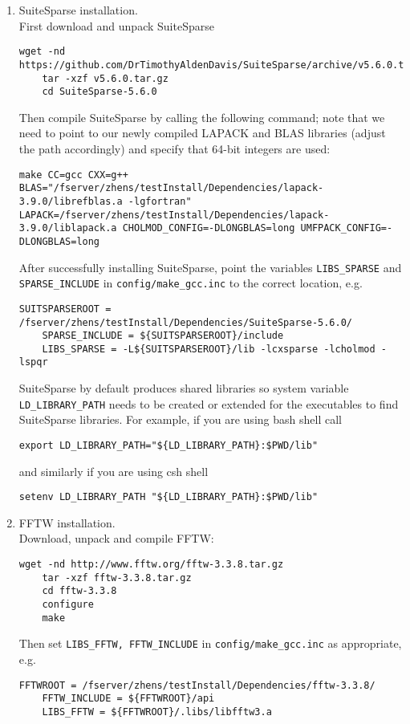 \documentclass[english,11pt]{article}
\begin{document}
\begin{enumerate}
    \item SuiteSparse installation.\\
    First download and unpack SuiteSparse
    \begin{lstlisting}[breaklines=true, showstringspaces=false]
    wget -nd https://github.com/DrTimothyAldenDavis/SuiteSparse/archive/v5.6.0.tar.gz
    tar -xzf v5.6.0.tar.gz
    cd SuiteSparse-5.6.0
    \end{lstlisting}
    Then compile SuiteSparse by calling the following command; note that we need to point to our newly compiled LAPACK and BLAS libraries (adjust the path accordingly) and specify that 64-bit integers are used:
    \begin{lstlisting}[breaklines=true, showstringspaces=false]
    make CC=gcc CXX=g++ BLAS="/fserver/zhens/testInstall/Dependencies/lapack-3.9.0/librefblas.a -lgfortran" LAPACK=/fserver/zhens/testInstall/Dependencies/lapack-3.9.0/liblapack.a CHOLMOD_CONFIG=-DLONGBLAS=long UMFPACK_CONFIG=-DLONGBLAS=long 
    \end{lstlisting}
    After successfully installing SuiteSparse, point the variables {\tt LIBS_SPARSE} and {\tt SPARSE_INCLUDE} in {\tt config/make_gcc.inc} to the correct location, e.g. 
    \begin{lstlisting}[breaklines=true, showstringspaces=false]
    SUITSPARSEROOT = /fserver/zhens/testInstall/Dependencies/SuiteSparse-5.6.0/
    SPARSE_INCLUDE = ${SUITSPARSEROOT}/include
    LIBS_SPARSE = -L${SUITSPARSEROOT}/lib -lcxsparse -lcholmod -lspqr
    \end{lstlisting}
    SuiteSparse by default produces shared libraries so system variable {\tt LD_LIBRARY_PATH} needs to be created or extended for the executables to find SuiteSparse libraries. For example, if you are using bash shell call
    \begin{lstlisting}[breaklines=true, showstringspaces=false]
    export LD_LIBRARY_PATH="${LD_LIBRARY_PATH}:$PWD/lib"
    \end{lstlisting}
    and similarly if you are using csh shell
    \begin{lstlisting}[breaklines=true, showstringspaces=false]
    setenv LD_LIBRARY_PATH "${LD_LIBRARY_PATH}:$PWD/lib" 
    \end{lstlisting}
    
    \item FFTW installation.\\
    Download, unpack and compile FFTW:
    \begin{lstlisting}[breaklines=true, showstringspaces=false]
    wget -nd http://www.fftw.org/fftw-3.3.8.tar.gz
    tar -xzf fftw-3.3.8.tar.gz
    cd fftw-3.3.8
    configure
    make
    \end{lstlisting}
    Then set {\tt LIBS_FFTW, FFTW_INCLUDE} in {\tt config/make_gcc.inc} as appropriate, e.g. 
    \begin{lstlisting}[breaklines=true, showstringspaces=false]
    FFTWROOT = /fserver/zhens/testInstall/Dependencies/fftw-3.3.8/
    FFTW_INCLUDE = ${FFTWROOT}/api
    LIBS_FFTW = ${FFTWROOT}/.libs/libfftw3.a
    \end{lstlisting}
    

\end{enumerate}
\end{document}
